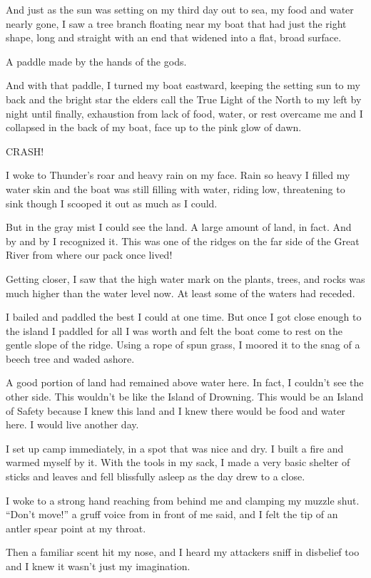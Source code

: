 And just as the sun was setting on my third day out to sea, my food and water nearly gone, I saw a tree branch floating near my boat that had just the right shape, long and straight with an end that widened into a flat, broad surface.

A paddle made by the hands of the gods.

And with that paddle, I turned my boat eastward, keeping the setting sun to my back and the bright star the elders call the True Light of the North to my left by night until finally, exhaustion from lack of food, water, or rest overcame me and I collapsed in the back of my boat, face up to the pink glow of dawn.

CRASH!

I woke to Thunder's roar and heavy rain on my face. Rain so heavy I filled my water skin and the boat was still filling with water, riding low, threatening to sink though I scooped it out as much as I could.

But in the gray mist I could see the land. A large amount of land, in fact. And by and by I recognized it. This was one of the ridges on the far side of the Great River from where our pack once lived!

Getting closer, I saw that the high water mark on the plants, trees, and rocks was much higher than the water level now. At least some of the waters had receded.

I bailed and paddled the best I could at one time. But once I got close enough to the island I paddled for all I was worth and felt the boat come to rest on the gentle slope of the ridge. Using a rope of spun grass, I moored it to the snag of a beech tree and waded ashore.

A good portion of land had remained above water here. In fact, I couldn't see the other side. This wouldn't be like the Island of Drowning. This would be an Island of Safety because I knew this land and I knew there would be food and water here. I would live another day.

I set up camp immediately, in a spot that was nice and dry. I built a fire and warmed myself by it. With the tools in my sack, I made a very basic shelter of sticks and leaves and fell blissfully asleep as the day drew to a close.

I woke to a strong hand reaching from behind me and clamping my muzzle shut. ``Don't move!'' a gruff voice from in front of me said, and I felt the tip of an antler spear point at my throat.

Then a familiar scent hit my nose, and I heard my attackers sniff in disbelief too and I knew it wasn't just my imagination.

